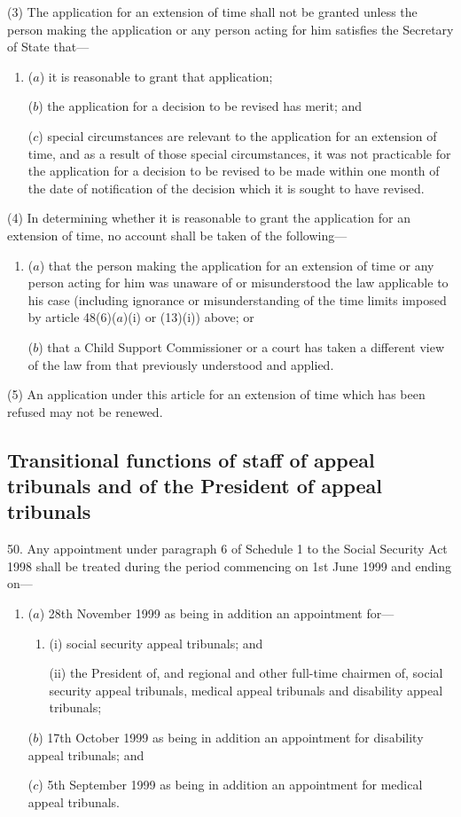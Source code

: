\documentclass[12pt,a4paper]{article}
\begin{document}
(3) The application for an extension of time shall not be granted unless the person making the application or any person acting for him satisfies the Secretary of State that—
\begin{enumerate}\item[]
($a$) it is reasonable to grant that application;

($b$) the application for a decision to be revised has merit; and

($c$) special circumstances are relevant to the application for an extension of time, and as a result of those special circumstances, it was not practicable for the application for a decision to be revised to be made within one month of the date of notification of the decision which it is sought to have revised.
\end{enumerate}

(4) In determining whether it is reasonable to grant the application for an extension of time, no account shall be taken of the following—
\begin{enumerate}\item[]
($a$) that the person making the application for an extension of time or any person acting for him was unaware of or misunderstood the law applicable to his case (including ignorance or misunderstanding of the time limits imposed by article 48(6)($a$)(i) or (13)(i)) above; or

($b$) that a Child Support Commissioner or a court has taken a different view of the law from that previously understood and applied.
\end{enumerate}

(5) An application under this article for an extension of time which has been refused may not be renewed.

\subsection[50. Transitional functions of staff of appeal tribunals and of the President of appeal tribunals]{Transitional functions of staff of appeal tribunals and of the President of appeal tribunals}

50.  Any appointment under paragraph 6 of Schedule 1 to the Social Security Act 1998 shall be treated during the period commencing on 1st June 1999 and ending on—
\begin{enumerate}\item[]
($a$) 28th November 1999 as being in addition an appointment for—
\begin{enumerate}\item[]
(i) social security appeal tribunals; and

(ii) the President of, and regional and other full-time chairmen of, social security appeal tribunals, medical appeal tribunals and disability appeal tribunals;
\end{enumerate}

($b$) 17th October 1999 as being in addition an appointment for disability appeal tribunals; and

($c$) 5th September 1999 as being in addition an appointment for medical appeal tribunals.
\end{enumerate}
\end{document}
